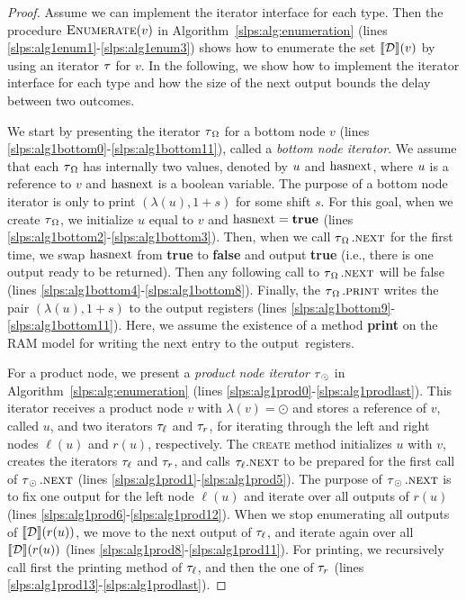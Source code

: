 \begin{proof}
	Assume we can implement the iterator interface for each type. Then the procedure $\textsc{Enumerate}(v)$ in Algorithm~\ref{slps:alg:enumeration} (lines \ref{slps:alg1enum1}-\ref{slps:alg1enum3}) shows how to enumerate the set ${\llbracket{\mathcal{D}}\rrbracket}(v)$ by using an iterator $\operatorname{\tau}$ for $v$. In the following, we show how to implement the iterator interface for each type and how the size of the next output bounds the delay between two outcomes.
	
	
	We start by presenting the iterator $\operatorname{\tau}_\Omega$ for a bottom node $v$ (lines \ref{slps:alg1bottom0}-\ref{slps:alg1bottom11}), called a \emph{bottom node iterator}. We assume that each $\operatorname{\tau}_\Omega$ has internally two values, denoted by $u$ and $\operatorname{hasnext}$, where $u$ is a reference to $v$ and $\operatorname{hasnext}$ is a boolean variable. The purpose of a bottom node iterator is only to print $(\lambda(u), 1+s)$ for some shift $s$. For this goal, when we create $\operatorname{\tau}_\Omega$, we initialize $u$ equal to $v$ and $\operatorname{hasnext} = {\bf true}$ (lines \ref{slps:alg1bottom2}-\ref{slps:alg1bottom3}). Then, when we call $\operatorname{\tau}_\Omega.\textsc{next}$ for the first time, we swap $\operatorname{hasnext}$ from {\bf true} to {\bf false} and output {\bf true} (i.e., there is one output ready to be returned). Then any following call to $\operatorname{\tau}_\Omega.\textsc{next}$ will be false (lines \ref{slps:alg1bottom4}-\ref{slps:alg1bottom8}). Finally, the $\operatorname{\tau}_\Omega.\textsc{print}$ writes the pair $(\lambda(u),1+s)$ to the output registers (lines \ref{slps:alg1bottom9}-\ref{slps:alg1bottom11}). Here, we assume the existence of a method {\bf print} on the RAM model for writing the next entry to the output~registers. 
	
	
	For a product node, we present a \emph{product node iterator} $\operatorname{\tau}_\odot$ in Algorithm~\ref{slps:alg:enumeration} (lines \ref{slps:alg1prod0}-\ref{slps:alg1prodlast}). 
	This iterator receives a product node $v$ with $\lambda(v) = \odot$ and stores a reference of $v$, called $u$, and two iterators $\tau_{\ell}$ and $\tau_{r}$, for iterating through the left and right nodes $\ell(u)$ and $r(u)$, respectively. 
	The \textsc{create} method initializes $u$ with $v$, creates the iterators $\tau_{\ell}$ and $\tau_{r}$, and calls $\tau_{\ell}.\textsc{next}$ to be prepared for the first call of $\operatorname{\tau}_\odot.\textsc{next}$ (lines \ref{slps:alg1prod1}-\ref{slps:alg1prod5}).
	The purpose of $\operatorname{\tau}_\odot.\textsc{next}$ is to fix one output for the left node $\ell(u)$ and iterate over all outputs of $r(u)$ (lines \ref{slps:alg1prod6}-\ref{slps:alg1prod12}). When we stop enumerating all outputs of ${\llbracket{\mathcal{D}}\rrbracket}(r(u))$, we move to the next output of $\tau_{\ell}$, and iterate again over all ${\llbracket{\mathcal{D}}\rrbracket}(r(u))$ (lines \ref{slps:alg1prod8}-\ref{slps:alg1prod11}).
	For printing, we recursively call first the printing method of $\tau_{\ell}$, and then the one of $\tau_{r}$ (lines \ref{slps:alg1prod13}-\ref{slps:alg1prodlast}).
		

\end{proof}
